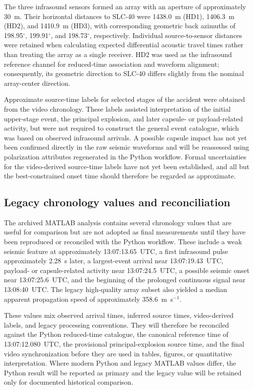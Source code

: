 \documentclass[]{seismica}
\begin{document}
The three infrasound sensors formed an array with an aperture of approximately
30~m. Their horizontal distances to SLC-40 were 1438.0~m (HD1), 1406.3~m
(HD2), and 1410.9~m (HD3), with corresponding geometric back azimuths of
198.95$^\circ$, 199.91$^\circ$, and 198.73$^\circ$, respectively. Individual
source-to-sensor distances were retained when calculating expected
differential acoustic travel times rather than treating the array as a single
receiver. HD2 was used as the infrasound reference channel for reduced-time
association and waveform alignment; consequently, its geometric direction to
SLC-40 differs slightly from the nominal array-center direction.

Approximate source-time labels for selected stages of the accident were
obtained from the video chronology. These labels assisted interpretation of the
initial upper-stage event, the principal explosion, and later
capsule- or payload-related activity, but were not required to construct the
general event catalogue, which was based on observed infrasound arrivals. A
possible capsule impact has not yet been confirmed directly in the raw seismic
waveforms and will be reassessed using polarization attributes regenerated in
the Python workflow. Formal uncertainties for the video-derived source-time
labels have not yet been established, and all but the best-constrained onset
time should therefore be regarded as approximate.

\subsection{Legacy chronology values and reconciliation}
\label{sec:methods_legacy_chronology}

The archived MATLAB analysis contains several chronology values that are useful
for comparison but are not adopted as final measurements until they have been
reproduced or reconciled with the Python workflow. These include a weak seismic
feature at approximately 13:07:13.65~UTC, a first infrasound pulse approximately
2.28~s later, a largest-event arrival near 13:07:19.43~UTC, payload- or
capsule-related activity near 13:07:24.5~UTC, a possible seismic onset near
13:07:25.6~UTC, and the beginning of the prolonged continuous signal near
13:08:40~UTC. The legacy high-quality array subset also yielded a median
apparent propagation speed of approximately 358.6~m~s$^{-1}$.

These values mix observed arrival times, inferred source times, video-derived
labels, and legacy processing conventions. They will therefore be reconciled
against the Python reduced-time catalogue, the canonical reference time of
13:07:12.080~UTC, the provisional principal-explosion source time, and the
final video synchronization before they are used in tables, figures, or
quantitative interpretation. Where modern Python and legacy MATLAB values
differ, the Python result will be reported as primary and the legacy value will
be retained only for documented historical comparison.
\end{document}
